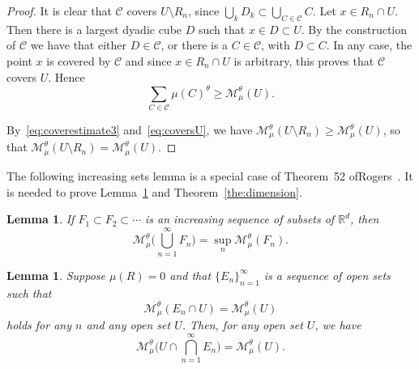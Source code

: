 \documentclass[10pt]{amsart}
\newtheorem{lemm}[theo]{Lemma}\newtheorem{prop}[theo]{Proposition}\newtheorem{coro}[theo]{Corollary}\newtheorem{conj}[theo]{Conjecture}
\theoremstyle{definition}\newtheorem{defi}[theo]{Definition}\newtheorem{rema}[theo]{Remark}\newtheorem{exam}[theo]{Example}\newtheorem{exem}[theo]{Example}\newtheorem{nota}[theo]{Notation}
\begin{document}
\begin{proof}
It is clear that $\mathscr{C}$ covers $U \setminus R_n$, since $\bigcup_k D_k \subset \bigcup_{C \in \mathscr{C}} C$. Let $x \in R_n
\cap U$. Then there is a largest dyadic cube $D$ such that $x \in D
\subset U$. By the construction of $\mathscr{C}$ we have that either $D \in \mathscr{C}$, or there is a $C \in \mathscr{C}$, with $D
\subset C$. In any case, the point $x$ is covered by $\mathscr{C}$ and since $x \in R_n \cap U$ is arbitrary, this proves that $\mathscr{C}$ covers $U$. Hence
\begin{equation}\label{eq:coversU}
\sum_{C \in \mathscr{C}} \mu (C)^\theta \geq \mathscr{M}_\mu^\theta (U).
\end{equation}

By~\eqref{eq:coverestimate3} and~\eqref{eq:coversU}, we have $\mathscr{M}_\mu^\theta (U \setminus R_n) \geq
\mathscr{M}_\mu^\theta (U)$, so that $\mathscr{M}_\mu^\theta (U
\setminus R_n) = \mathscr{M}_\mu^\theta (U)$.
\end{proof}

The following increasing sets lemma is a special case of Theorem~52 of\linebreak Rogers~\cite{rogers}. It is needed to prove Lemma~\ref{lem:intersection} and Theorem~\ref{the:dimension}.

\begin{lemm}\label{lem:increasingsets}
If $F_1 \subset F_2 \subset \cdots$ is an increasing sequence of\/ subsets of\/ $\mathbb{R}^d$, then
\[
\mathscr{M}_\mu^\theta \biggl(\bigcup_{n=1}^\infty F_n \biggr) =
\sup_n \mathscr{M}_\mu^\theta (F_n).
\]
\end{lemm}

\begin{lemm}\label{lem:intersection}
Suppose $\mu (R) = 0$ and that $\{E_n\}_{n=1}^\infty$ is a sequence of open sets such that
\begin{equation}\label{eq:intersectionlemma}
\mathscr{M}_\mu^\theta (E_n \cap U) =
\mathscr{M}_\mu^\theta (U)
\end{equation}
holds for any $n$ and any open set $U$. Then, for any open set $U$, we have
\[
\mathscr{M}_\mu^\theta \biggl(U \cap \bigcap_{n=1}^\infty E_n
\biggr) = \mathscr{M}_\mu^\theta (U).
\]
\end{lemm}
\end{document}
